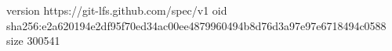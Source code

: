 version https://git-lfs.github.com/spec/v1
oid sha256:e2a620194e2df95f70ed34ac00ee4879960494b8d76d3a97e97e6718494c0588
size 300541
